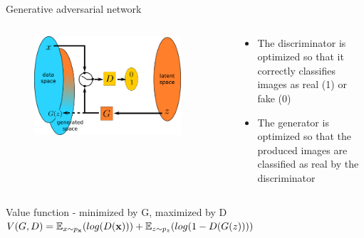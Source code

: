 \documentclass[xcolor=pdftex,dvipsnames,table,mathserif,aspectratio=169]{beamer}
\begin{document}
\begin{frame}{Generative adversarial network~\tiny{\cite{goodfellow_generative_2014}}}

  \begin{columns}
    \begin{column}{.5\textwidth}
  \begin{figure}[ht]
    \centering
    \includegraphics[width=0.9\textwidth]{gan2}
  \end{figure}

    \end{column}

    \begin{column}{.5\textwidth}
  \begin{itemize}
  \item The discriminator is optimized so that it correctly classifies images as real (1) or fake (0)
  \item The generator is optimized so that the produced images are classified as real by the discriminator
  \end{itemize}

    \end{column}
  \end{columns}


  \begin{block}{Value function - minimized by G, maximized by D}
    $V(G,D) = \mathbb{E}_{x \sim p_{\mathbf{x}}}(log(D(\mathbf{x}))) + \mathbb{E}_{z \sim p_z}(log(1 - D(G(z))))$
  \end{block}

\end{frame}


\end{document}
